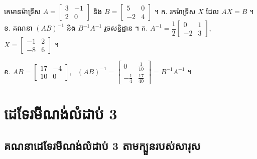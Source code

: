 \begin{pro}
គេមានម៉ាទ្រីស $A = \begin{bmatrix} 3 & -1\\ 2 & 0 \end{bmatrix}$ និង $B = \begin{bmatrix} 5 & 0\\ -2 & 4 \end{bmatrix}$ ។ \quad ក. រកម៉ាទ្រីស $X$ ដែល $AX = B$ ។ \quad ខ. គណនា $(AB)^{-1}$ និង $B^{-1}A^{-1}$ រួចសន្និដ្ឋាន ។
\ans
ក. $A^{-1} = \dfrac{1}{2}\begin{bmatrix} 0 & 1\\ -2 & 3 \end{bmatrix}$, \ $X = \begin{bmatrix} -1 & 2\\ -8 & 6 \end{bmatrix}$ ។

ខ. $AB = \begin{bmatrix} 17 & -4\\ 10 & 0 \end{bmatrix}$, \ $(AB)^{-1} = \begin{bmatrix} 0 & \frac{1}{10}\\ -\frac{1}{4} & \frac{17}{40} \end{bmatrix} = B^{-1}A^{-1}$ ។
\end{pro}

\section{ដេទែរមីណង់លំដាប់ 3}

\subsection{គណនាដេទែរមីណង់លំដាប់ 3 តាមក្បួនរបស់សារុស}

